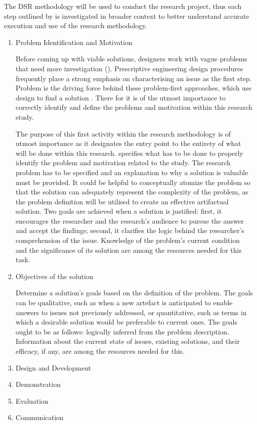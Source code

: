 \par{The DSR methodology will be used to conduct the research project, thus each step outlined by \cite{peffers2007design} is investigated in broader context to better understand accurate execution and use of the research methodology.}
\par{\begin{enumerate}
        \item Problem Identification and Motivation
\par{Before coming up with viable solutions, designers work with vague problems that need more investigation (\citealt{buchanan1992wicked, rittel1973dilemmas}). Prescriptive engineering design procedures frequently place a strong emphasis on characterising an issue as the first step. Problem  is the driving force behind these problem-first approaches, which use design to find a solution \citep{dewey2022we}. There for it is of the utmost importance to correctly identify and define the problems and motivation within this research study.}
\par{The purpose of this first activity within the research methodology is of utmost importance as it designates the entry point to the entirety of what will be done within this research. \cite{peffers2007design} specifies what has to be done to properly identify the problem and motivation related to the study. The research problem has to be specified and an explanation to why a solution is valuable must be provided. It could be helpful to conceptually atomize the problem so that the solution can adequately represent the complexity of the problem, as the problem definition will be utilised to create an effective artifactual solution. Two goals are achieved when a solution is justified: first, it encourages the researcher and the research's audience to pursue the answer and accept the findings; second, it clarifies the logic behind the researcher's comprehension of the issue. Knowledge of the problem's current condition and the significance of its solution are among the resources needed for this task.}
        \item Objectives of the solution
\par{Determine a solution's goals based on the definition of the problem. The goals can be qualitative, such as when a new artefact is anticipated to enable answers to issues not previously addressed, or quantitative, such as terms in which a desirable solution would be preferable to current ones. The goals ought to be as follows: logically inferred from the problem description. Information about the current state of issues, existing solutions, and their efficacy, if any, are among the resources needed for this.}
        \item Design and Development
\par{}
        \item Demonstration
        \item Evaluation
        \item Communication
\end{enumerate}}
